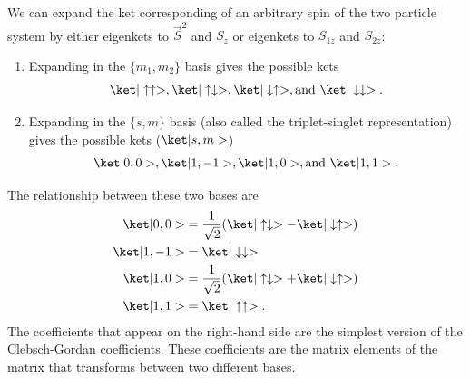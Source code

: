 We can expand the ket corresponding of an arbitrary spin of the two particle system by either eigenkets to $\vec{S}^2$ and $S_z$ or eigenkets to $S_{1z}$ and $S_{2z}$:
\begin{enumerate}
    \item Expanding in the $\{m_1, m_2\}$ basis gives the possible kets
            \begin{equation}
                \k{\uparrow \uparrow}, \k{\uparrow\downarrow}, \k{\downarrow\uparrow}, \text{and } \k{\downarrow\downarrow}.
            \end{equation}
    \item Expanding in the $\{s, m\}$ basis (also called the triplet-singlet representation) gives the possible kets ($\k{s, m}$)
            \begin{equation}
                \k{0, 0}, \k{1,-1}, \k{1,0}, \text{and } \k{1,1}.
            \end{equation}
\end{enumerate}
The relationship between these two bases are 
\begin{align}
    \k{0,0}     &= \frac{1}{\sqrt{2}} (\k{\uparrow\downarrow} - \k{\downarrow\uparrow})\\
    \k{1,-1}    &= \k{\downarrow\downarrow}\\
    \k{1,0}     &= \frac{1}{\sqrt{2}} (\k{\uparrow\downarrow} + \k{\downarrow\uparrow})\\
    \k{1,1}     &= \k{\uparrow\uparrow}.
\end{align}
The coefficients that appear on the right-hand side are the simplest version of the Clebsch-Gordan coefficients. These coefficients are the matrix elements of the matrix that transforms between two different bases.


